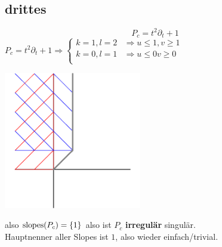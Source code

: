\subsection{drittes}

\[
  P_c=t^2\partial_t+1
\]
$
P_c=t^2\partial_t+1
\Rightarrow
\begin{cases}
  k=1, l=2 & \Rightarrow u \leq 1, v \geq 1\\
  k=0, l=1 & \Rightarrow u \leq 0  v \geq 0\\
\end{cases}
$
\begin{center}
  \includegraphics[width=6cm]{beispiele/img/c.png}
\end{center}

also $\operatorname{slopes}(P_c)=\{1\}$ also ist $P_c$ \textbf{irregulär} singulär.\\
Hauptnenner aller Slopes ist $1$, also wieder einfach/trivial.

